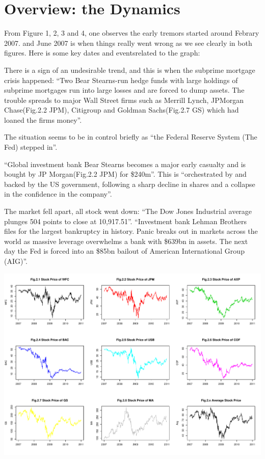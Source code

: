 \documentclass[11pt]{article}
\begin{document}
\section{Overview: the Dynamics}\vspace{-1em}
From Figure 1, 2, 3 and 4, one observes the early tremors started around Febrary 2007. and June 2007 is when things really went wrong as we see clearly in both figures. Here is some key dates and eventsrelated to the graph:
\begin{description}\vspace{-1em}
\item[Jun. 2008] There is a sign of an undesirable trend, and this is when the subprime mortgage crisis happened: ``Two Bear Stearns-run hedge funds with large holdings of subprime mortgages run into large losses and are forced to dump assets. The trouble spreads to major Wall Street firms such as Merrill Lynch, JPMorgan Chase(Fig.2.2 JPM), Citigroup and Goldman Sachs(Fig.2.7 GS) which had loaned the firms money''\cite{Guillen}.
\item[22 Jan. 2008] The situation seems to be in control briefly as ``the Federal Reserve System (The Fed) stepped in''\cite{Jolly}.
\item[14 Mar. 2008] ``Global investment bank Bear Stearns becomes a major early casualty and is bought by JP Morgan(Fig.2.2 JPM) for \$240m''\cite{Jolly}. This is ``orchestrated by and backed by the US government, following a sharp decline in shares and a collapse in the confidence in the company''\cite{Guillen}.
\item[15 Sep. 2008] The market fell apart, all stock went down: ``The Dow Jones Industrial average plunges 504 points to close at 10,917.51''\cite{Guillen}. ``Investment bank Lehman Brothers files for the largest bankruptcy in history. Panic breaks out in markets across the world as massive leverage overwhelms a bank with \$639bn in assets. The next day the Fed is forced into an \$85bn bailout of American International Group (AIG)''\cite{Jolly}.
\end{description}
\begin{center}
\includegraphics[width=0.95\linewidth]{graph/FinancialStockPrice.pdf}
\end{center}
\end{document}
